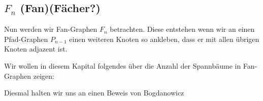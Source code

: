 \subsection{$F_n$ (Fan)(Fächer?)}
Nun werden wir Fan-Graphen $F_n$ betrachten. Diese entstehen wenn wir an einen Pfad-Graphen $P_{n-1}$ einen weiteren Knoten so ankleben, dass er mit allen übrigen Knoten adjazent ist. 

Wir wollen in diesem Kapital folgendes über die Anzahl der Spannbäume in Fan-Graphen zeigen:
\begin{equation}
\end{equation}

Diesmal halten wir uns an einen Beweis von Bogdanowicz ~\cite{bogdanowicz_2008}
